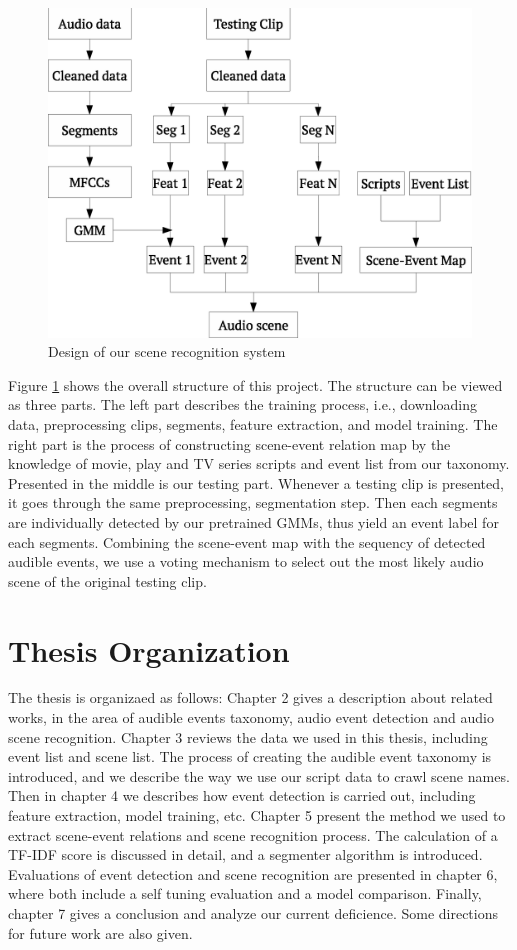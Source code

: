 \begin{figure}[htb!]
\centering
\includegraphics[scale=0.6]{figure/intro/structure}
\caption{Design of our scene recognition system}
\label{fig:structure}
\end{figure}

Figure \ref{fig:structure} shows the overall structure of this project. 
The structure can be viewed as three parts. 
The left part describes the training process, i.e., downloading data, preprocessing clips, segments, feature extraction, and model training. 
The right part is the process of constructing scene-event relation map by the knowledge of movie, play and TV series scripts and event list from our taxonomy. 
Presented in the middle is our testing part. 
Whenever a testing clip is presented, it goes through the same preprocessing, segmentation step. 
Then each segments are individually detected by our pretrained GMMs, thus yield an event label for each segments. 
Combining the scene-event map with the sequency of detected audible events, we use a voting mechanism to select out the most likely audio scene of the original testing clip. 

\section{Thesis Organization}
The thesis is organizaed as follows: Chapter 2 gives a description about related works, in the area of audible events taxonomy, audio event detection and audio scene recognition. 
Chapter 3 reviews the data we used in this thesis, including event list and scene list. 
The process of creating the audible event taxonomy is introduced, and we describe the way we use our script data to crawl scene names. 
Then in chapter 4 we describes how event detection is carried out, including feature extraction, model training, etc. 
Chapter 5 present the method we used to extract scene-event relations and scene recognition process. 
The calculation of a TF-IDF score is discussed in detail, and a segmenter algorithm is introduced. 
Evaluations of event detection and scene recognition are presented in chapter 6, where both include a self tuning evaluation and a model comparison. 
Finally, chapter 7 gives a conclusion and analyze our current deficience.   
Some directions for future work are also given. 

